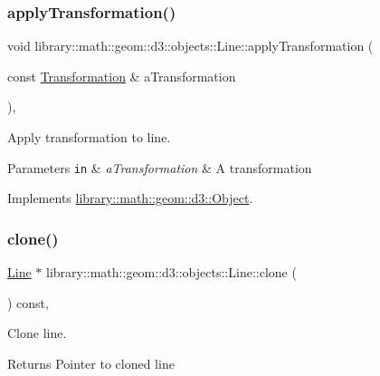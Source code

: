 \subsubsection{\texorpdfstring{apply\+Transformation()}{applyTransformation()}}
{\footnotesize\ttfamily void library\+::math\+::geom\+::d3\+::objects\+::\+Line\+::apply\+Transformation (\begin{DoxyParamCaption}\item[{const \hyperlink{classlibrary_1_1math_1_1geom_1_1d3_1_1_transformation}{Transformation} \&}]{a\+Transformation }\end{DoxyParamCaption})\hspace{0.3cm}{\ttfamily [override]}, {\ttfamily [virtual]}}



Apply transformation to line. 


\begin{DoxyParams}[1]{Parameters}
\mbox{\tt in}  & {\em a\+Transformation} & A transformation \\
\hline
\end{DoxyParams}


Implements \hyperlink{classlibrary_1_1math_1_1geom_1_1d3_1_1_object_a5fc47b1ee5d9a28efc6010d3d1512470}{library\+::math\+::geom\+::d3\+::\+Object}.

\mbox{\label{classlibrary_1_1math_1_1geom_1_1d3_1_1objects_1_1_line_a55382b24007bccdae721176d0f73536f}} 
\subsubsection{\texorpdfstring{clone()}{clone()}}
{\footnotesize\ttfamily \hyperlink{classlibrary_1_1math_1_1geom_1_1d3_1_1objects_1_1_line}{Line} $\ast$ library\+::math\+::geom\+::d3\+::objects\+::\+Line\+::clone (\begin{DoxyParamCaption}{ }\end{DoxyParamCaption}) const\hspace{0.3cm}{\ttfamily [override]}, {\ttfamily [virtual]}}



Clone line. 

\begin{DoxyReturn}{Returns}
Pointer to cloned line 
\end{DoxyReturn}



